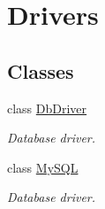 \section{Drivers}
\label{group__OWL__DRIVERS}
\subsection*{Classes}
\begin{DoxyCompactItemize}
\item 
class \hyperlink{classDbDriver}{DbDriver}
\begin{DoxyCompactList}\small\item\em Database driver. \item\end{DoxyCompactList}\item 
class \hyperlink{classMySQL}{MySQL}
\begin{DoxyCompactList}\small\item\em Database driver. \item\end{DoxyCompactList}\end{DoxyCompactItemize}
